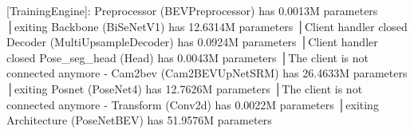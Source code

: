 [TrainingEngine]: Preprocessor (BEVPreprocessor) has 0.0013M parameters                                                                                             │exiting
                  Backbone (BiSeNetV1) has 12.6314M parameters                                                                                                      │Client handler closed
                  Decoder (MultiUpsampleDecoder) has 0.0924M parameters                                                                                             │Client handler closed
                  Pose_seg_head (Head) has 0.0043M parameters                                                                                                       │The client is not connected anymore - 
                  Cam2bev (Cam2BEVUpNetSRM) has 26.4633M parameters                                                                                                 │exiting
                  Posnet (PoseNet4) has 12.7626M parameters                                                                                                         │The client is not connected anymore - 
                  Transform (Conv2d) has 0.0022M parameters                                                                                                         │exiting
                  Architecture (PoseNetBEV) has 51.9576M parameters




